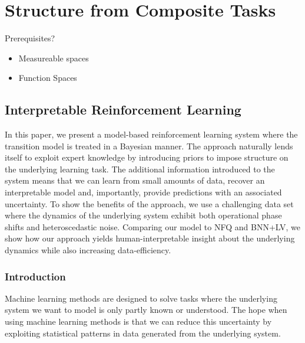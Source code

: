 \chapter{Structure from Composite Tasks}
\label{cha:structure_from_composite_tasks}
Prerequisites?
\begin{itemize}
    \item Measureable spaces
    \item Function Spaces
\end{itemize}

\section{Interpretable Reinforcement Learning}
\label{sec:interpretable_reinforcement_learning}
In this paper, we present a model-based reinforcement learning system where the transition model is treated in a Bayesian manner.
The approach naturally lends itself to exploit expert knowledge by introducing priors to impose structure on the underlying learning task.
The additional information introduced to the system means that we can learn from small amounts of data, recover an interpretable model and, importantly, provide predictions with an associated uncertainty.
To show the benefits of the approach, we use a challenging data set where the dynamics of the underlying system exhibit both operational phase shifts and heteroscedastic noise.
Comparing our model to NFQ and BNN+LV, we show how our approach yields human-interpretable insight about the underlying dynamics while also increasing data-efficiency.


\subsection{Introduction}
\label{sub:interpretable_reinforcement_learning:introduction}
Machine learning methods \parencite{shalev-shwartz_understanding_2014} are designed to solve tasks where the underlying system we want to model is only partly known or understood.
The hope when using machine learning methods is that we can reduce this uncertainty by exploiting statistical patterns in data generated from the underlying system.

